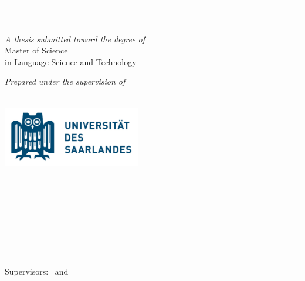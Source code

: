 %
\begin{titlepage}
	\tgherosfont
	\flushright
	\hfill
	\vfill
	
	{\color{ctcolormain}
	{\LARGE\textbf{\thesisTitle}} \par
	{\Large \thesisSubtitle} \par
	} %
	
	\rule[5pt]{\textwidth}{.4pt} \par
	
	{\LARGE \authorName} \\[2mm]

	\vfill
	
	
	\textit{A thesis submitted toward the degree of} \\[1mm]
	{\Large Master of Science} \\[1mm]
	{\large in Language Science and Technology} \\	
	
	\vfill	
	
	\textit{Prepared under the supervision of} \\
	\thesisFirstSupervisor \\
	\thesisSecondSupervisor 
	
	\vfill
	
	
	\includegraphics[width=6cm]{img/uni_des_saarlandes} \\[2mm]
	{\Large \thesisUniversity} \\[2mm]
	{\large \thesisUniversityDepartment} \\
	
	\vfill
	
	\thesisDate \\
	
\end{titlepage}


\hfill
\vfill
\small
{\tgherosfont \textbf{\authorName}} \\
\texttt{\authorContact}\\
\textit{\thesisTitle} \\
\thesisDate \\
Supervisors: \thesisFirstSupervisor\ and \thesisSecondSupervisor \\

